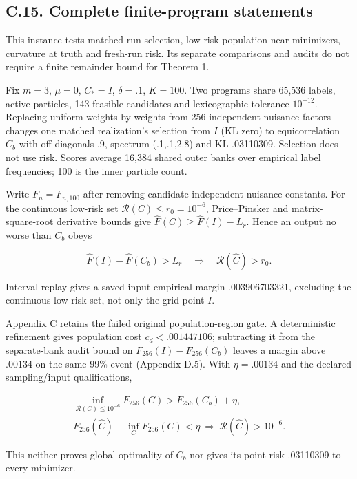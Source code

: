 \documentclass{article}
\begin{document}
\subsection*{C.15. Complete finite-program
statements}\label{finite-evidence-summary}

This instance tests matched-run selection, low-risk population
near-minimizers, curvature at truth and fresh-run risk. Its separate
comparisons and audits do not require a finite remainder bound for
Theorem 1.

Fix \(m=3\), \(\mu=0\), \(C_*=I\), \(\delta=.1\), \(K=100\). Two
programs share 65,536 labels, active particles, 143 feasible candidates
and lexicographic tolerance \(10^{-12}\). Replacing uniform weights by
weights from 256 independent nuisance factors changes one matched
realization's selection from \(I\) (KL zero) to equicorrelation \(C_b\)
with off-diagonals .9, spectrum (.1,.1,2.8) and KL .03110309. Selection
does not use risk. Scores average 16,384 shared outer banks over
empirical label frequencies; 100 is the inner particle count.

Write \(F_n=F_{n,100}\) after removing candidate-independent nuisance
constants. For the continuous low-risk set
\(\mathcal R(C)\le r_0=10^{-6}\), Price--Pinsker and matrix-square-root
derivative bounds give \(\widehat F(C)\ge\widehat F(I)-L_r\). Hence an
output no worse than \(C_b\) obeys

\[
\widehat F(I)-\widehat F(C_b)>L_r
\quad\Longrightarrow\quad \mathcal R(\widehat C)>r_0.
\]

Interval replay gives a saved-input empirical margin .003906703321,
excluding the continuous low-risk set, not only the grid point \(I\).

Appendix C retains the failed original population-region gate. A
deterministic refinement gives population cost \(c_d<.001447106\);
subtracting it from the separate-bank audit bound on
\(F_{256}(I)-F_{256}(C_b)\) leaves a margin above \(.00134\) on the same
99\% event (Appendix D.5). With \(\eta=.00134\) and the declared
sampling/input qualifications,

\[
\begin{gathered}
\inf_{\mathcal R(C)\le10^{-6}}F_{256}(C)
>F_{256}(C_b)+\eta,\\
F_{256}(\widehat C)-\inf_C F_{256}(C)<\eta
\ \Longrightarrow\ \mathcal R(\widehat C)>10^{-6}.
\end{gathered}
\]

This neither proves global optimality of \(C_b\) nor gives its point
risk .03110309 to every minimizer.
\end{document}
